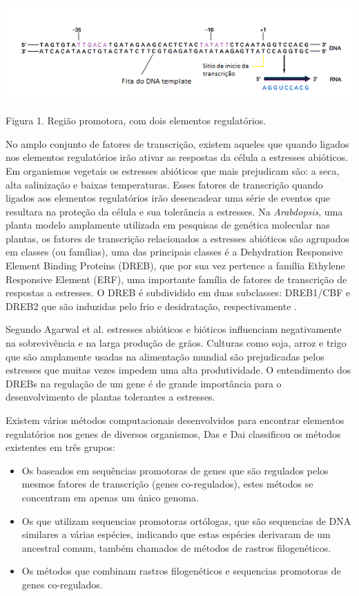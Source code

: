 \includegraphics[]{imagens/regiaopromotora}

Figura 1. Região promotora, com dois elementos regulatórios.


No amplo conjunto de fatores de transcrição, existem aqueles que quando ligados nos elementos regulatórios irão ativar as respostas da célula a estresses abióticos. Em organismos vegetais os estresses abióticos que mais prejudicam são: a seca, alta salinização e baixas temperaturas. Esses fatores de transcrição quando ligados aos elementos regulatórios irão desencadear uma série de eventos que resultara na proteção da célula e sua tolerância a estresses. Na \textit{Arabdopsis}, uma planta modelo amplamente utilizada em pesquisas de genética molecular nas plantas, os fatores de transcrição relacionados a estresses abióticos são agrupados em classes (ou famílias), uma das principais classes é a Dehydration Responsive Element Binding Proteins (DREB), que por sua vez pertence a família Ethylene Responsive Element (ERF), uma importante família de fatores de transcrição de respostas a estresses. O DREB é subdividido em duas subclasses: DREB1/CBF e DREB2 que são induzidas pelo frio e desidratação, respectivamente \cite{Agarwal2006}.

Segundo Agarwal et al.\cite{Agarwal2006} estresses abióticos e bióticos influenciam negativamente na sobrevivência e na larga produção de grãos. Culturas como soja, arroz e trigo que são amplamente usadas na alimentação mundial são prejudicadas pelos estresses que muitas vezes impedem uma alta produtividade. O entendimento dos DREBs na regulação de um gene é de grande importância para o desenvolvimento de plantas tolerantes a estresses.


Existem vários métodos computacionais desenvolvidos para encontrar elementos regulatórios nos genes de diversos organismos, Das e Dai \cite{Das2007} classificou os métodos existentes em três grupos:
\begin{itemize}
\item Os baseados em sequências promotoras de genes que são regulados pelos mesmos fatores de transcrição (genes co-regulados), estes métodos se concentram em apenas um único genoma.

\item Os que utilizam sequencias promotoras ortólogas, que são sequencias de DNA similares a várias espécies, indicando que estas espécies derivaram de um ancestral comum, também chamados de métodos de rastros filogenéticos.

\item Os métodos que combinam rastros filogenéticos e sequencias promotoras de genes co-regulados.
\end{itemize}


